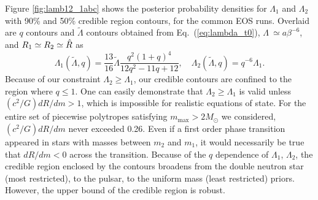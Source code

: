 Figure \ref{fig:lamb12_1abc} shows the posterior probability densities for $\Lambda_1$ and $\Lambda_2$ with 90\% and 50\% credible region contours, for the common EOS runs. Overlaid are $q$ contours and $\tilde{\Lambda}$ contours obtained from Eq.~(\ref{eq:lambda_t0}), $\Lambda~\simeq a\beta^{-6}$, and $R_1 \simeq R_2 \simeq \large \hat R$ as
\begin{equation}
\Lambda_1(\tilde{\Lambda},q)={\frac{13}{16}}\tilde{\Lambda}{\frac{q^2(1+q)^4}{12q^2-11q+12}},
\label{eq:l1l2}\quad \Lambda_2(\tilde{\Lambda},q) = q^{-6} \Lambda_1 .\end{equation}
Because of our constraint $\Lambda_2 \geq \Lambda_1$, our credible contours are confined to the region where $q \leq 1$. One can easily demonstrate that $\Lambda_2 \geq \Lambda_1$ is valid unless $(c^2/G)dR/dm > 1$, which is impossible for realistic equations of state. For the entire set of piecewise polytropes satisfying $m_\mathrm{max}>2M_\odot$ we considered, $(c^2/G)dR/dm$ never exceeded 0.26. Even if a first order phase transition appeared in stars with masses between $m_2$ and $m_1$, it would necessarily be true that $dR/dm < 0$ across the transition. Because of the $q$ dependence of $\Lambda_1$, $\Lambda_2$, the credible region enclosed by the contours broadens from the double neutron star (most restricted), to the pulsar, to the uniform mass (least restricted) priors. However, the upper bound of the credible region is robust.

